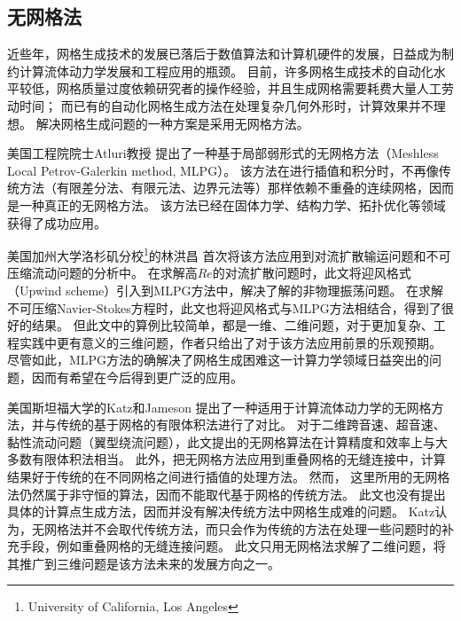 \documentclass[doctor,openright,twoside,color]{buaathesis}
\begin{document}
\subsection{无网格法}
近些年，网格生成技术的发展已落后于数值算法和计算机硬件的发展，日益成为制约计算流体动力学发展和工程应用的瓶颈。
目前，许多网格生成技术的自动化水平较低，网格质量过度依赖研究者的操作经验，并且生成网格需要耗费大量人工劳动时间；
而已有的自动化网格生成方法在处理复杂几何外形时，计算效果并不理想。
解决网格生成问题的一种方案是采用无网格方法。

美国工程院院士Atluri教授
提出了一种基于局部弱形式的无网格方法（Meshless Local Petrov-Galerkin method, MLPG）。
该方法在进行插值和积分时，不再像传统方法（有限差分法、有限元法、边界元法等）那样依赖不重叠的连续网格，因而是一种真正的无网格方法。
该方法已经在固体力学、结构力学、拓扑优化等领域获得了成功应用。

美国加州大学洛杉矶分校\footnote{University of California, Los Angeles}的林洪昌
首次将该方法应用到对流扩散输运问题和不可压缩流动问题的分析中。
在求解高$Re$的对流扩散问题时，此文将迎风格式（Upwind scheme）引入到MLPG方法中，解决了解的非物理振荡问题。
在求解不可压缩Navier-Stokes方程时，此文也将迎风格式与MLPG方法相结合，得到了很好的结果。
但此文中的算例比较简单，都是一维、二维问题，对于更加复杂、工程实践中更有意义的三维问题，作者只给出了对于该方法应用前景的乐观预期。
尽管如此，MLPG方法的确解决了网格生成困难这一计算力学领域日益突出的问题，因而有希望在今后得到更广泛的应用。

美国斯坦福大学的Katz和Jameson
提出了一种适用于计算流体动力学的无网格方法，并与传统的基于网格的有限体积法进行了对比。
对于二维跨音速、超音速、黏性流动问题（翼型绕流问题），此文提出的无网格算法在计算精度和效率上与大多数有限体积法相当。
此外，把无网格方法应用到重叠网格的无缝连接中，计算结果好于传统的在不同网格之间进行插值的处理方法。
然而， 这里所用的无网格法仍然属于非守恒的算法，因而不能取代基于网格的传统方法。
此文也没有提出具体的计算点生成方法，因而并没有解决传统方法中网格生成难的问题。
Katz认为，无网格法并不会取代传统方法，而只会作为传统的方法在处理一些问题时的补充手段，例如重叠网格的无缝连接问题。
此文只用无网格法求解了二维问题，将其推广到三维问题是该方法未来的发展方向之一。
\end{document}
